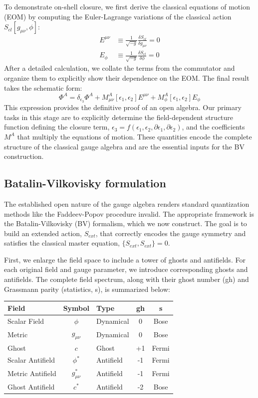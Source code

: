 \documentclass[twocolumn]{aastex631}
\begin{document}
To demonstrate on-shell closure, we first derive the classical equations of motion (EOM) by computing the Euler-Lagrange variations of the classical action $S_{cl}[g_{\mu\nu},\phi]$:
\begin{align}
E^{\mu\nu} &\equiv \frac{1}{\sqrt{-g}} \frac{\delta S_{cl}}{\delta g_{\mu\nu}} = 0 \\
E_{\phi} &\equiv \frac{1}{\sqrt{-g}} \frac{\delta S_{cl}}{\delta \phi} = 0
\end{align}
After a detailed calculation, we collate the terms from the commutator and organize them to explicitly show their dependence on the EOM. The final result takes the schematic form:
\begin{equation}
[\delta_{\epsilon_1}, \delta_{\epsilon_2}] \Phi^A = \delta_{\epsilon_3} \Phi^A + M^A_{\mu\nu}[\epsilon_1, \epsilon_2] E^{\mu\nu} + M^A_{\phi}[\epsilon_1, \epsilon_2] E_{\phi}
\end{equation}
This expression provides the definitive proof of an open algebra. Our primary tasks in this stage are to explicitly determine the field-dependent structure function defining the closure term, $\epsilon_3 = f(\epsilon_1, \epsilon_2, \partial\epsilon_1, \partial\epsilon_2)$, and the coefficients $M^A$ that multiply the equations of motion. These quantities encode the complete structure of the classical gauge algebra and are the essential inputs for the BV construction.

\subsection{Batalin-Vilkovisky formulation}
The established open nature of the gauge algebra renders standard quantization methods like the Faddeev-Popov procedure invalid. The appropriate framework is the Batalin-Vilkovisky (BV) formalism, which we now construct. The goal is to build an extended action, $S_{ext}$, that correctly encodes the gauge symmetry and satisfies the classical master equation, $\{S_{ext}, S_{ext}\} = 0$.

First, we enlarge the field space to include a tower of ghosts and antifields. For each original field and gauge parameter, we introduce corresponding ghosts and antifields. The complete field spectrum, along with their ghost number (gh) and Grassmann parity (statistics, s), is summarized below:
\begin{center}
\begin{tabular}{|l|c|l|c|c|}
\hline
\textbf{Field} & \textbf{Symbol} & \textbf{Type} & \textbf{gh} & \textbf{s} \\ \hline
Scalar Field & $\phi$ & Dynamical & 0 & Bose \\
Metric & $g_{\mu\nu}$ & Dynamical & 0 & Bose \\
Ghost & $c$ & Ghost & +1 & Fermi \\
Scalar Antifield & $\phi^*$ & Antifield & -1 & Fermi \\
Metric Antifield & $g_{\mu\nu}^*$ & Antifield & -1 & Fermi \\
Ghost Antifield & $c^*$ & Antifield & -2 & Bose \\ \hline
\end{tabular}
\end{center}
\end{document}
